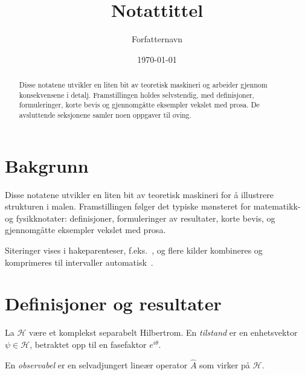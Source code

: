 \documentclass[a4paper,11pt]{article}
\title{Notattittel}
\author{Forfatternavn}
\date{\today}
\begin{document}
\maketitle

\begin{abstract}
Disse notatene utvikler en liten bit av teoretisk maskineri og
arbeider gjennom konsekvensene i detalj. Framstillingen holdes
selvstendig, med definisjoner, formuleringer, korte bevis og
gjennomgåtte eksempler vekslet med prosa. De avsluttende
seksjonene samler noen oppgaver til øving.
\end{abstract}

\clearpage
\framedtoc
\clearpage


\section{Bakgrunn}

Disse notatene utvikler en liten bit av teoretisk maskineri
for å illustrere strukturen i malen. Framstillingen følger
det typiske mønsteret for matematikk- og fysikknotater:
definisjoner, formuleringer av resultater, korte bevis, og
gjennomgåtte eksempler vekslet med prosa.

Siteringer vises i hakeparenteser, f.eks.\ \cite{eksempel-artikkel},
og flere kilder kombineres og komprimeres til intervaller
automatisk~\cite{eksempel-artikkel,eksempel-bok}.


\section{Definisjoner og resultater}

\begin{viktig}
\begin{definisjon}
  La $\mathcal{H}$ være et komplekst separabelt Hilbertrom. En
  \emph{tilstand} er en enhetsvektor $\psi \in \mathcal{H}$,
  betraktet opp til en fasefaktor $e^{i\theta}$.
\end{definisjon}
\end{viktig}

\begin{definisjon}
  En \emph{observabel} er en selvadjungert lineær operator
  $\hat{A}$ som virker på $\mathcal{H}$.
\end{definisjon}
\end{document}
